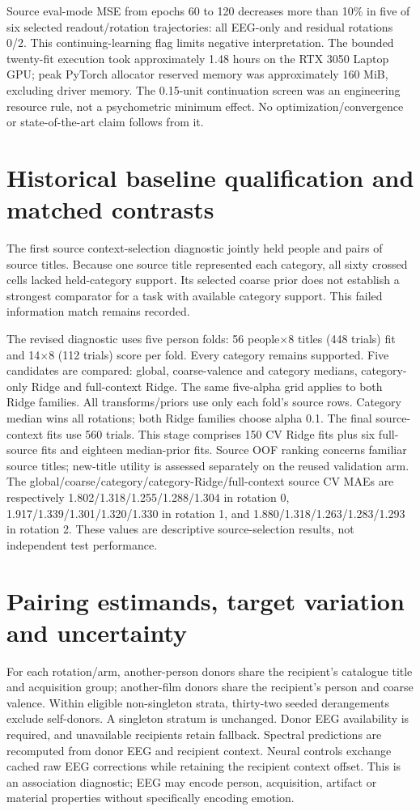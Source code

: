 \documentclass[10pt,a4paper]{article}
\begin{document}
Source eval-mode MSE from epochs 60 to 120 decreases more than 10\% in five of six selected readout/rotation trajectories: all EEG-only and residual rotations 0/2. This continuing-learning flag limits negative interpretation. The bounded twenty-fit execution took approximately 1.48 hours on the RTX 3050 Laptop GPU; peak PyTorch allocator reserved memory was approximately 160 MiB, excluding driver memory. The 0.15-unit continuation screen was an engineering resource rule, not a psychometric minimum effect. No optimization/convergence or state-of-the-art claim follows from it.

\section{Historical baseline qualification and matched contrasts}
The first source context-selection diagnostic jointly held people and pairs of source titles. Because one source title represented each category, all sixty crossed cells lacked held-category support. Its selected coarse prior does not establish a strongest comparator for a task with available category support. This failed information match remains recorded.

The revised diagnostic uses five person folds: 56 people\(\times\)8 titles (448 trials) fit and 14\(\times\)8 (112 trials) score per fold. Every category remains supported. Five candidates are compared: global, coarse-valence and category medians, category-only Ridge and full-context Ridge. The same five-alpha grid applies to both Ridge families. All transforms/priors use only each fold's source rows. Category median wins all rotations; both Ridge families choose alpha 0.1. The final source-context fits use 560 trials. This stage comprises 150 CV Ridge fits plus six full-source fits and eighteen median-prior fits. Source OOF ranking concerns familiar source titles; new-title utility is assessed separately on the reused validation arm. The global/coarse/category/category-Ridge/full-context source CV MAEs are respectively 1.802/1.318/1.255/1.288/1.304 in rotation 0, 1.917/1.339/1.301/1.320/1.330 in rotation 1, and 1.880/1.318/1.263/1.283/1.293 in rotation 2. These values are descriptive source-selection results, not independent test performance.

\section{Pairing estimands, target variation and uncertainty}
For each rotation/arm, another-person donors share the recipient's catalogue title and acquisition group; another-film donors share the recipient's person and coarse valence. Within eligible non-singleton strata, thirty-two seeded derangements exclude self-donors. A singleton stratum is unchanged. Donor EEG availability is required, and unavailable recipients retain fallback. Spectral predictions are recomputed from donor EEG and recipient context. Neural controls exchange cached raw EEG corrections while retaining the recipient context offset. This is an association diagnostic; EEG may encode person, acquisition, artifact or material properties without specifically encoding emotion.
\end{document}
